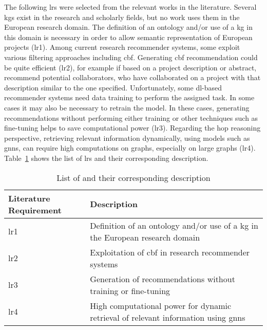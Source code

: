 The following \glspl{lr} were selected from the relevant works in the literature.
Several \glspl{kg} exist in the research and scholarly fields, but no work uses them in the European research domain.
The definition of an ontology and/or use of a \gls{kg} in this domain is necessary in order to allow semantic representation of European projects (\gls{lr}1).
Among current research recommender systems, some exploit various filtering approaches including \gls{cbf}.
Generating \gls{cbf} recommendation could be quite efficient (\gls{lr}2), for example if based on a project description or abstract, recommend potential collaborators, who have collaborated on a project with that description similar to the one specified.
Unfortunately, some \gls{dl}-based recommender systems need data training to perform the assigned task.
In some cases it may also be necessary to retrain the model.
In these cases, generating recommendations without performing either training or other techniques such as fine-tuning helps to save computational power (\gls{lr}3).
Regarding the hop reasoning perspective, retrieving relevant information dynamically, using models such as \glspl{gnn}, can require high computations on graphs, especially on large graphs (\gls{lr}4).
Table~\ref{tab:literature-requirements} shows the list of \glspl{lr} and their corresponding description.

\begin{table}[htbp]
    \centering
    \scriptsize
    \begin{tabularx}{\textwidth}{|>{\centering\arraybackslash}p{2cm}|X|}
      \hline
      \textbf{Literature Requirement} & \textbf{Description}\\
        \hline
        \gls{lr}1 & Definition of an ontology and/or use of a \gls{kg} in the European research domain \\
        \gls{lr}2 & Exploitation of \gls{cbf} in research recommender systems \\
        \gls{lr}3 & Generation of recommendations without training or fine-tuning \\
        \gls{lr}4 & High computational power for dynamic retrieval of relevant information using \glspl{gnn} \\
        \hline
    \end{tabularx}
    \caption{List of  and their corresponding description}
    \label{tab:literature-requirements}
\end{table}